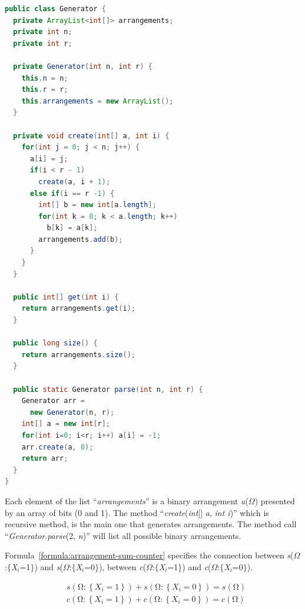 \documentclass{article}
\numberwithin{equation}{section}
\numberwithin{figure}{section}
\numberwithin{table}{section}
\begin{document}
\begin{lstlisting}[language = Java]
public class Generator {
  private ArrayList<int[]> arrangements;
  private int n;
  private int r;

  private Generator(int n, int r) {
    this.n = n;
    this.r = r;
    this.arrangements = new ArrayList();
  }

  private void create(int[] a, int i) {
    for(int j = 0; j < n; j++) {
      a[i] = j;
      if(i < r - 1)
        create(a, i + 1);
      else if(i == r -1) {
        int[] b = new int[a.length];
        for(int k = 0; k < a.length; k++)
          b[k] = a[k];
        arrangements.add(b);
      }
    }
  }

  public int[] get(int i) {
    return arrangements.get(i);
  }

  public long size() {
    return arrangements.size();
  }

  public static Generator parse(int n, int r) {
    Generator arr =
      new Generator(n, r);
    int[] a = new int[r];
    for(int i=0; i<r; i++) a[i] = -1;
    arr.create(a, 0);
    return arr;
  }
}
\end{lstlisting}

Each element of the list ``\textit{arrangements}'' is a binary arrangement \textit{a}($\Omega$) presented by an array of bits (0 and 1). The method ``\textit{create}(\textit{int}[] \textit{a}, \textit{int i})'' which is recursive method, is the main one that generates arrangements. The method call ``\textit{Generator}.\textit{parse}(2, \textit{n})'' will list all possible binary arrangements.

Formula~\ref{formula:arrangement-sum-counter} specifies the connection between \textit{s}($\Omega$:$\{$\textit{X${}_{i}$}=1$\}$) and \textit{s}($\Omega$:$\{$\textit{X${}_{i}$}=0$\}$), between \textit{c}($\Omega$:$\{$\textit{X${}_{i}$}=1$\}$) and \textit{c}($\Omega$:$\{$\textit{X${}_{i}$}=0$\}$).

\begin{equation}
\begin{split}
&s\left(\mathrm{\Omega }\mathrm{:}\left\{X_i=1\right\}\right)+s\left(\mathrm{\Omega }\mathrm{:}\left\{X_i=0\right\}\right)=s\left(\mathrm{\Omega }\right)\\
&c\left(\mathrm{\Omega }\mathrm{:}\left\{X_i=1\right\}\right)+c\left(\mathrm{\Omega }\mathrm{:}\left\{X_i=0\right\}\right)=c\left(\mathrm{\Omega }\right)
\end{split}
\label{formula:arrangement-sum-counter}
\end{equation} 
\end{document}
